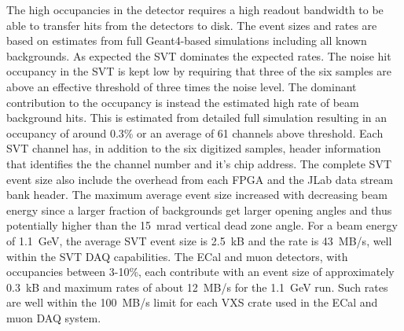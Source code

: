 The high occupancies in the detector requires a high readout bandwidth to be able to transfer hits from the 
detectors to disk. The event sizes and rates are based on estimates from full Geant4-based simulations 
including all known backgrounds. As expected the SVT dominates the expected rates. 
The noise hit occupancy in the SVT is kept low by requiring that three of the six samples are above an
effective threshold of three times the noise level. The dominant contribution to the occupancy is instead 
the estimated high rate of beam background hits. This is estimated 
from detailed full simulation resulting in an occupancy of around 0.3\% or an average of 61 channels above threshold.  
Each SVT channel has, in addition to the six digitized samples,  header information that identifies the 
the channel number and it's chip address. The complete SVT event size also 
include the overhead from each FPGA and the JLab data stream bank header.  
The maximum average event size increased with decreasing beam energy since a larger 
fraction of backgrounds get larger opening angles and thus potentially higher than the 15~mrad 
vertical dead zone angle. For a beam energy of 1.1~GeV, the average SVT event size is 2.5~kB and 
the rate is 43~MB/s, well within the SVT DAQ capabilities. 
The ECal and muon detectors, with occupancies between 3-10\%, each contribute with an event size of 
approximately 0.3~kB and maximum rates of about 12~MB/s for the 1.1~GeV run. 
 Such rates are well within the 100~MB/s limit for each VXS crate used in the ECal and muon 
DAQ system.
